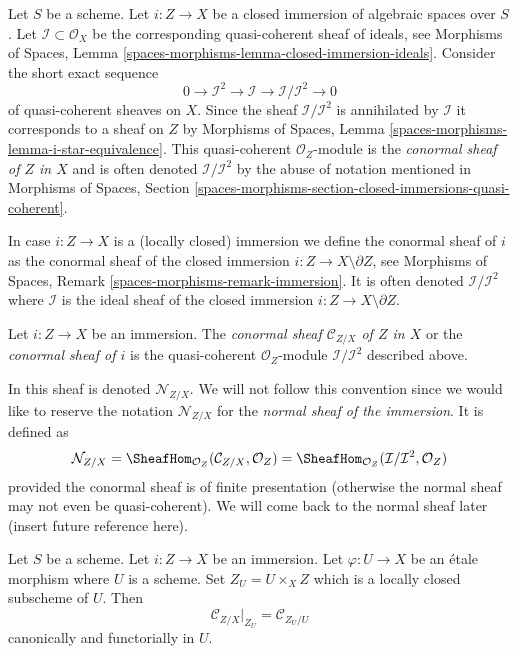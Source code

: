 \noindent
Let $S$ be a scheme. Let $i : Z \to X$ be a closed immersion of algebraic
spaces over $S$. Let $\mathcal{I} \subset \mathcal{O}_X$ be the corresponding
quasi-coherent sheaf of ideals, see
Morphisms of Spaces,
Lemma \ref{spaces-morphisms-lemma-closed-immersion-ideals}.
Consider the short exact sequence
$$
0 \to \mathcal{I}^2 \to \mathcal{I} \to \mathcal{I}/\mathcal{I}^2 \to 0
$$
of quasi-coherent sheaves on $X$. Since the sheaf $\mathcal{I}/\mathcal{I}^2$
is annihilated by $\mathcal{I}$ it corresponds to a sheaf on $Z$ by
Morphisms of Spaces, Lemma \ref{spaces-morphisms-lemma-i-star-equivalence}.
This quasi-coherent $\mathcal{O}_Z$-module is the
{\it conormal sheaf of $Z$ in $X$} and is often denoted
$\mathcal{I}/\mathcal{I}^2$ by the abuse of notation mentioned in
Morphisms of Spaces,
Section \ref{spaces-morphisms-section-closed-immersions-quasi-coherent}.

\medskip\noindent
In case $i : Z \to X$ is a (locally closed) immersion we define the
conormal sheaf of $i$ as the conormal sheaf of the closed
immersion $i : Z \to X \setminus \partial Z$, see
Morphisms of Spaces, Remark \ref{spaces-morphisms-remark-immersion}.
It is often denoted
$\mathcal{I}/\mathcal{I}^2$ where $\mathcal{I}$ is the ideal sheaf
of the closed immersion $i : Z \to X \setminus \partial Z$.

\begin{definition}
\label{definition-conormal-sheaf}
Let $i : Z \to X$ be an immersion. The {\it conormal sheaf
$\mathcal{C}_{Z/X}$ of $Z$ in $X$} or the {\it conormal sheaf of $i$}
is the quasi-coherent $\mathcal{O}_Z$-module $\mathcal{I}/\mathcal{I}^2$
described above.
\end{definition}

\noindent
In \cite[IV Definition 16.1.2]{EGA} this sheaf is denoted
$\mathcal{N}_{Z/X}$. We will not follow this convention since we would
like to reserve the notation $\mathcal{N}_{Z/X}$
for the {\it normal sheaf of the immersion}. It is defined as
$$
\mathcal{N}_{Z/X} =
\SheafHom_{\mathcal{O}_Z}(\mathcal{C}_{Z/X}, \mathcal{O}_Z) =
\SheafHom_{\mathcal{O}_Z}(\mathcal{I}/\mathcal{I}^2, \mathcal{O}_Z)
$$
provided the conormal sheaf is of finite presentation (otherwise the
normal sheaf may not even be quasi-coherent). We will come back to the
normal sheaf later (insert future reference here).

\begin{lemma}
\label{lemma-etale-conormal}
Let $S$ be a scheme. Let $i : Z \to X$ be an immersion.
Let $\varphi : U \to X$ be an \'etale morphism where $U$ is a scheme.
Set $Z_U = U \times_X Z$ which is a locally closed subscheme of $U$.
Then
$$
\mathcal{C}_{Z/X}|_{Z_U} = \mathcal{C}_{Z_U/U}
$$
canonically and functorially in $U$.
\end{lemma}

